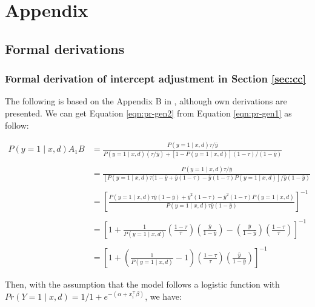 \section{Appendix}
\subsection{Formal derivations}

\subsubsection{Formal derivation of intercept adjustment in Section \ref{sec:cc}}
\label{apdx:proof-intercept}

The following is based on the Appendix B in \cite{king2001logistic}, although own derivations are presented. We can get Equation \ref{eqn:pr-gen2} from Equation \ref{eqn:pr-gen1} as follow:

\begin{align*}
    P(y=1 \mid x, d) A_1 B &= \frac{P(y=1 \mid x, d) \tau / \bar{y}}{P(y=1 \mid x, d)(\tau / \bar{y})+[1-P(y=1 \mid x, d)](1-\tau) /(1-\bar{y})}\\
    \\
    &= \frac{P(y=1 \mid x, d) \tau / \bar{y}}{[P(y=1 \mid x, d)\tau(1-\bar{y} + \bar{y}(1-\tau) - \bar{y}(1-\tau)P(y=1 \mid x, d)]/\bar{y}(1-\bar{y})}\\
    \\
    & = \left[\frac{P(y=1 \mid x, d) \tau \bar{y}(1-\bar{y}) + \bar{y}^2(1-\tau) - \bar{y}^2(1-\tau)P(y=1 \mid x, d)}{P(y=1 \mid x, d) \tau \bar{y}(1-\bar{y})}\right]^{-1}\\
    \\
    &= \left[ 1 + \frac{1}{P(y=1 \mid x, d)} \left(\frac{1 - \tau}{\tau}\right) \left(\frac{\bar{y}}{1-\bar{y}}\right) - \left(\frac{\bar{y}}{1-\bar{y}}\right) \left(\frac{1 - \tau}{\tau}\right) \right]^{-1}\\
    \\
    &= \left[ 1 + \left(\frac{1}{P(y=1 \mid x, d)} - 1\right) \left(\frac{1 - \tau}{\tau}\right) \left(\frac{\bar{y}}{1-\bar{y}}\right) \right]^{-1}    
\end{align*}

Then, with the assumption that the model follows a logistic function with $Pr(Y=1 \mid x, d) = 1/1+e^{-(\alpha + x_i^\intercal \beta)}$, we have:

